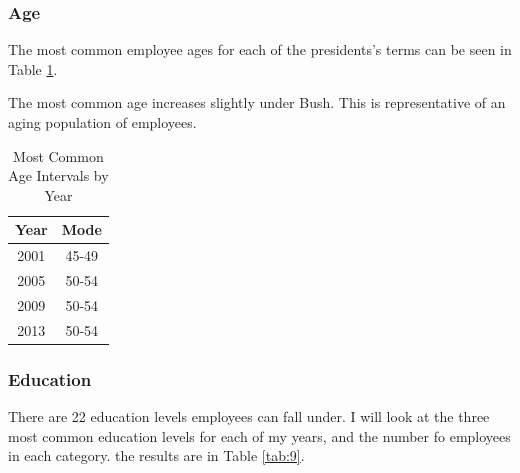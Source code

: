 \documentclass{article}
\begin{document}
        \subsubsection{Age}
        The most common employee ages for each of the presidents's terms can be seen in Table \ref{tab:8}.
        \par
        The most common age increases slightly under Bush. This is representative of an aging population of employees.

            \begin{center}
                \begin{table}
                    \centering
                    \begin{tabular}{ |c|c| }
                        \hline
                        Year & Mode \\
                        \hline
                        2001 & 45-49 \\
                        2005 & 50-54 \\
                        2009 & 50-54 \\
                        2013 & 50-54 \\
                        \hline
                    \end{tabular}
                    \caption{Most Common Age Intervals by Year}
                    \label{tab:8}
                \end{table}
            \end{center}

        \subsubsection{Education}
        There are 22 education levels employees can fall under. I will look at the three most common education levels for each of my years, and the number fo employees in each category. the results are in Table \ref{tab:9}.
\end{document}
